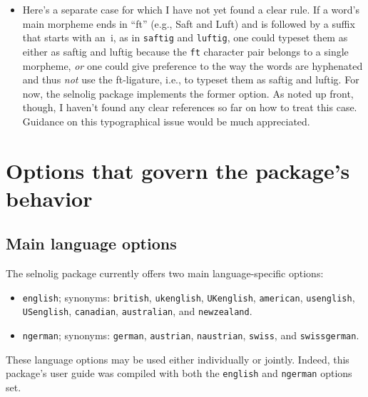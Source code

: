 \documentclass[12pt]{article}
\newcommand{\pkg}[1]{\textsf{#1}}
\newcommand{\opt}[1]{\texttt{#1}}
\begin{document}
\begin{itemize}
This convention also suggests that it's permissible to use the ffi- and ffl-ligatures in abbreviated names such as Steffi and Steffl even though they do not involve a period (full stop). 

The convention might further seem to imply that the~ft and~\char"E187\ ligatures may (should?) be used if they occur at the very ends of words and word fragments\textemdash e.g., geschärft, Unbedarftheit, and erscha\char"E187\textemdash but that they should be suppressed when -f-te, -f-ten, -f-tes, etc.\ suffixes are involved\textemdash e.g., gestreifte, schlürftest, and rafften. I make this analogy because these suffixes also form syllables. Note, though, the deliberate use of the locution \enquote{seem to imply} at the start of this paragraph: I have \emph{not} encountered so far any kind of authoritative discussion of this particular typographical concern. For now, the \pkg{selnolig} package \emph{does} break up the ft and fft ligatures if the words include suffixes that are syllables in their own right.


\item Here's a separate case for which I have not yet found a clear rule. If a word's main morpheme ends in \enquote{ft} (e.g., Saft and Luft) and is followed by a suffix that starts with an~i, as in \opt{saftig} and \opt{luftig}, one could typeset them as either as saftig and lu\mbox{ft}ig because the \opt{ft} character pair belongs to a single morpheme, \emph{or} one could give preference to the way the words are hyphenated and thus \emph{not} use the ft-ligature, i.e., to typeset them as saf\breaklig tig and luf\breaklig tig. For now, the \pkg{selnolig} package implements the former option. As noted up front, though, I haven't found any clear references so far on how to treat this case. Guidance on this typographical issue would be much appreciated.

\end{itemize}



\section{Options that govern the package's behavior}
\label{sec:options}

\subsection{Main language options}

The \pkg{selnolig} package currently offers two main language-specific options: 
\begin{itemize}
\item \opt{english}; synonyms: \opt{british}, \opt{ukenglish}, \opt{UKenglish}, \opt{amer\-ican},  \opt{usenglish}, \opt{USenglish}, \opt{cana\-dian}, \opt{australian}, and \opt{new\-zealand}.
\item \opt{ngerman}; synonyms: \opt{german}, \opt{austrian}, \opt{naustrian}, \opt{swiss}, and \opt{swiss\-german}.
\end{itemize}
These language options may be used either individually or jointly. Indeed, this package's user guide was compiled with both the \opt{english} and \opt{ngerman} options set.
\end{document}
